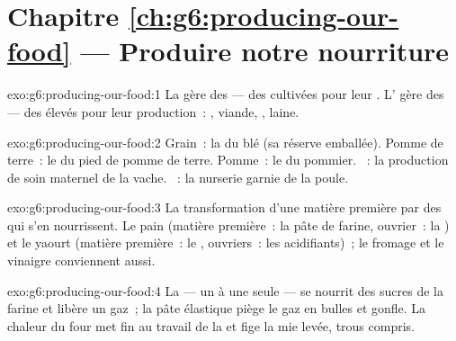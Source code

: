 \section*{Chapitre \ref{ch:g6:producing-our-food} --- Produire notre nourriture}

\begin{solution}{exo:g6:producing-our-food:1}
La  gère des  --- des  cultivées pour leur
. L' gère des  --- des 
élevés pour leur production~: , viande, , laine.
\end{solution}

\begin{solution}{exo:g6:producing-our-food:2}
Grain~: la  du blé (sa réserve emballée). Pomme de terre~: le
 du pied de pomme de terre. Pomme~: le  du pommier.
~: la production de soin maternel de la vache. ~: la nurserie
garnie de la poule.
\end{solution}

\begin{solution}{exo:g6:producing-our-food:3}
La transformation d'une matière première par des  qui s'en
nourrissent. Le pain (matière première~: la pâte de farine,
ouvrier~: la ) et le yaourt (matière première~: le ,
ouvriers~: les  acidifiants)~; le fromage et le vinaigre
conviennent aussi.
\end{solution}

\begin{solution}{exo:g6:producing-our-food:4}
La  --- un  à une seule  --- se nourrit des
sucres de la farine et libère un gaz~; la pâte élastique piège le
gaz en bulles et gonfle. La chaleur du four met fin au travail de la
 et fige la mie levée, trous compris.
\end{solution}

